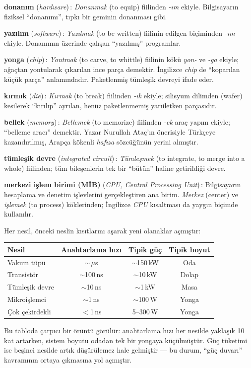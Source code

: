 \begin{terimnotu}
\textbf{donanım} (\emph{hardware})\,: \emph{Donanmak} (to equip) fiilinden \emph{-ım} ekiyle. Bilgisayarın fiziksel ``donanımı'', tıpkı bir geminin donanması gibi.

\textbf{yazılım} (\emph{software})\,: \emph{Yazılmak} (to be written) fiilinin edilgen biçiminden \emph{-ım} ekiyle. Donanımın üzerinde çalışan ``yazılmış'' programlar.

\textbf{yonga} (\emph{chip})\,: \emph{Yontmak} (to carve, to whittle) fiilinin kökü \emph{yon-} ve \emph{-ga} ekiyle; ağaçtan yontularak çıkarılan ince parça demektir. İngilizce \emph{chip} de ``koparılan küçük parça'' anlamındadır. Paketlenmiş tümleşik devreyi ifade eder.

\textbf{kırmık} (\emph{die})\,: \emph{Kırmak} (to break) fiilinden \emph{-ık} ekiyle; silisyum dilimden (wafer) kesilerek ``kırılıp'' ayrılan, henüz paketlenmemiş yarıiletken parçasıdır.

\textbf{bellek} (\emph{memory})\,: \emph{Bellemek} (to memorize) fiilinden \emph{-ek} araç yapım ekiyle; ``belleme aracı'' demektir. Yazar Nurullah Ataç'ın önerisiyle Türkçeye kazandırılmış, Arapça kökenli \emph{hafıza} sözcüğünün yerini almıştır.

\textbf{tümleşik devre} (\emph{integrated circuit})\,: \emph{Tümleşmek} (to integrate, to merge into a whole) fiilinden; tüm bileşenlerin tek bir ``bütün'' haline getirildiği devre.

\textbf{merkezi işlem birimi (MİB)} (\emph{CPU, Central Processing Unit})\,: Bilgisayarın hesaplama ve denetim işlevlerini gerçekleştiren ana birim. \emph{Merkez} (center) ve \emph{işlemek} (to process) köklerinden; İngilizce \emph{CPU} kısaltması da yaygın biçimde kullanılır.
\end{terimnotu}

\begin{karsilastirma}
Her nesil, önceki neslin kısıtlarını aşarak yeni olanaklar açmıştır:

\begin{center}
\small
\begin{tabular}{lccc}
\toprule
\textbf{Nesil} & \textbf{Anahtarlama hızı} & \textbf{Tipik güç} & \textbf{Tipik boyut} \\
\midrule
Vakum tüpü & $\sim$\,$\mu$s & $\sim$150\,kW & Oda \\
Transistör & $\sim$100\,ns & $\sim$10\,kW & Dolap \\
Tümleşik devre & $\sim$10\,ns & $\sim$1\,kW & Masa \\
Mikroişlemci & $\sim$1\,ns & $\sim$100\,W & Yonga \\
Çok çekirdekli & $<$1\,ns & 5--300\,W & Yonga \\
\bottomrule
\end{tabular}
\end{center}

Bu tabloda çarpıcı bir örüntü görülür: anahtarlama hızı her nesilde yaklaşık 10 kat artarken, sistem boyutu odadan tek bir yongaya küçülmüştür. Güç tüketimi ise beşinci nesilde artık düşürülemez hale gelmiştir --- bu durum, ``güç duvarı'' kavramının ortaya çıkmasına yol açmıştır.
\end{karsilastirma}

